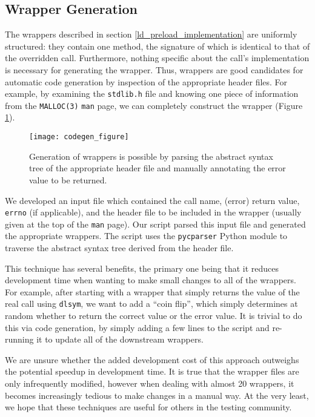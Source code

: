\subsection{Wrapper Generation}
The wrappers described in section \ref{ld_preload_implementation} are uniformly structured: they contain one method, the signature of which is identical to that of the overridden call. Furthermore, nothing specific about the call's implementation is necessary for generating the wrapper. Thus, wrappers are good candidates for automatic code generation by inspection of the appropriate header files. For example, by examining the \texttt{stdlib.h} file and knowing one piece of information from the \texttt{MALLOC(3)} \texttt{man} page, we can completely construct the wrapper (Figure \ref{fig:codegen}).

\begin{figure}[h!]
\centering
\texttt{[image: codegen\_figure]}
\caption{Generation of wrappers is possible by parsing the abstract syntax tree of the appropriate header file and manually annotating the error value to be returned.}
\label{fig:codegen}
\end{figure}

We developed an input file which contained the call name, (error) return value, \texttt{errno} (if applicable), and the header file to be included in the wrapper (usually given at the top of the \texttt{man} page). Our script parsed this input file and generated the appropriate wrappers. The script uses the \texttt{pycparser} Python module \cite{pycparser} to traverse the abstract syntax tree derived from the header file.

This technique has several benefits, the primary one being that it reduces development time when wanting to make small changes to all of the wrappers. For example, after starting with a wrapper that simply returns the value of the real call using \texttt{dlsym}, we want to add a ``coin flip'', which simply determines at random whether to return the correct value or the error value. It is trivial to do this via code generation, by simply adding a few lines to the script and re-running it to update all of the downstream wrappers.

We are unsure whether the added development cost of this approach outweighs the potential speedup in development time. It is true that the wrapper files are only infrequently modified, however when dealing with almost 20 wrappers, it becomes increasingly tedious to make changes in a manual way. At the very least, we hope that these techniques are useful for others in the testing community.